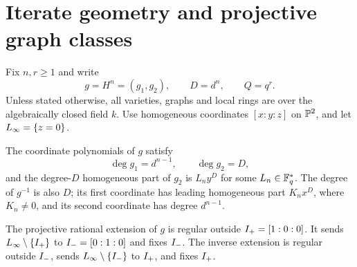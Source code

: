 \section{Iterate geometry and projective graph classes}\label{sec:geometry}

Fix $n,r\geq1$ and write
\begin{equation}\label{eq:gDQ}
 g=H^n=(g_1,g_2),\qquad D=d^n,\qquad Q=q^r.
\end{equation}
Unless stated otherwise, all varieties, graphs and local rings are over
the algebraically closed field $k$. Use homogeneous coordinates
$[x:y:z]$ on $\mathbb P^2$, and let $L_{\infty}=\{z=0\}$.

\begin{lemma}\label{lem:degrees}
The coordinate polynomials of $g$ satisfy
\[
 \deg g_1=d^{n-1},\qquad \deg g_2=D,
\]
and the degree-$D$ homogeneous part of $g_2$ is $L_ny^D$ for some
$L_n\in\mathbb F_q^*$. The degree of $g^{-1}$ is also $D$; its first coordinate
has leading homogeneous part $K_nx^D$, where $K_n\ne0$, and its second
coordinate has degree $d^{n-1}$.

The projective rational extension of $g$ is regular outside
$I_{+}=[1:0:0]$. It sends $L_{\infty}\setminus\{I_{+}\}$ to
$I_{-}=[0:1:0]$ and fixes $I_{-}$. The inverse extension is regular outside
$I_{-}$, sends $L_{\infty}\setminus\{I_{-}\}$ to $I_{+}$, and fixes $I_{+}$.
\end{lemma}

